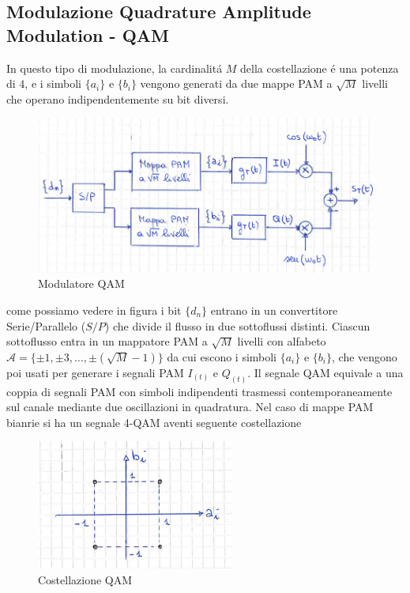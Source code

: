     \subsection{Modulazione Quadrature Amplitude Modulation - QAM}
        In questo tipo di modulazione, la cardinalitá $M$ della costellazione é una potenza di $4$, e i simboli $\{a_i\}$ e $\{b_i\}$
        vengono generati da due mappe PAM a $\sqrt{M}$ livelli che operano indipendentemente su bit diversi.
        \begin{figure}[H]
            \centering
            \includegraphics[width = 12cm]{media/modulatore qam.png}
            \caption{Modulatore QAM}
        \end{figure}
        \begin{sloppypar}
            come possiamo vedere in figura i bit $\{d_n\}$ entrano in un convertitore Serie/Parallelo ($S/P$) che divide il flusso in 
            due sottoflussi distinti. Ciascun sottoflusso entra in un mappatore PAM a $\sqrt{M}$ livelli con alfabeto
            ${\mathcal{A} = \{\pm 1, \pm 3,\dots, \pm(\sqrt{M}-1)\}}$ da cui escono i simboli $\{a_i\}$ e $\{b_i\}$, che vengono poi usati per generare 
            i segnali PAM $I_{(t)}$ e $Q_{(t)}$. Il segnale QAM equivale a una coppia di segnali PAM con simboli indipendenti trasmessi 
            contemporaneamente sul canale mediante due oscillazioni in quadratura. Nel caso di mappe PAM bianrie si ha un segnale 4-QAM aventi
            seguente costellazione
        \end{sloppypar}
        \begin{figure}[H]
            \centering
            \includegraphics[width = 6.5cm]{media/costellazione qam.png}
            \caption{Costellazione QAM}
        \end{figure}
